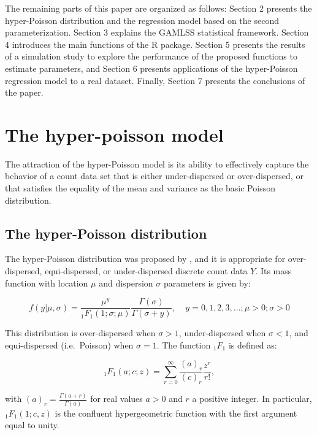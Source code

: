The remaining parts of this paper are organized as follows: Section 2 presents the hyper-Poisson distribution and the regression model based on the second parameterization. Section 3 explains the GAMLSS statistical framework. Section 4 introduces the main functions of the  R package. Section 5 presents the results of a simulation study to explore the performance of the proposed functions to estimate parameters, and Section 6 presents applications of the hyper-Poisson regression model to a real dataset. Finally, Section 7 presents the conclusions of the paper.

\section{The hyper-poisson model}\label{the-hyper-poisson-model}

The attraction of the hyper-Poisson model is its ability to effectively capture the behavior of a count data set that is either under-dispersed or over-dispersed, or that satisfies the equality of the mean and variance as the basic Poisson distribution.

\subsection{The hyper-Poisson distribution}\label{the-hyper-poisson-distribution}

The hyper-Poisson distribution was proposed by \citet{BardwellCrow1964}, and it is appropriate for over-dispersed, equi-dispersed, or under-dispersed discrete count data \(Y\). Its mass function with location \(\mu\) and dispersion \(\sigma\) parameters is given by:

\begin{equation} 
    f(y | \mu, \sigma) = \frac{\mu^y}{_1F_1(1;\sigma;\mu)}\frac{\Gamma(\sigma)}{\Gamma(\sigma + y)}, \;\;\;\; y=0,1,2, 3, \ldots; \mu>0; \sigma>0
  \label{eq:pdfhp}
\end{equation}

This distribution is over-dispersed when \(\sigma > 1\), under-dispersed when \(\sigma<1\), and equi-dispersed (i.e.~Poisson) when \(\sigma = 1\). The function \(_1F_1\) is defined as:

\begin{equation}
    _1F_1(a;c;z) = \sum_{r=0}^{\infty}\frac{(a)_r}{(c)_r}\frac{z^r}{r!},
  \label{eq:1f1p}
\end{equation}

with \((a)_r = \frac{\Gamma(a+r)}{\Gamma(a)}\) for real values \(a>0\) and \(r\) a positive integer. In particular, \(_1F_1(1;c, z)\) is the confluent hypergeometric function with the first argument equal to unity.

